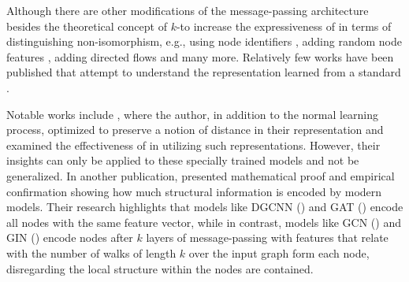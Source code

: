 Although there are other modifications of the message-passing architecture besides the theoretical concept of $k$-\gnn to increase the expressiveness of \gnns in terms of distinguishing non-isomorphism, e.g., using node identifiers \cite{Vignac2020}, adding random node features \cite{Sato2021,Abboud2020}, adding directed flows \cite{Beaini2021} and many more. Relatively few works have been published that attempt to understand the representation learned from a standard \gnn.

Notable works include \cite{Nikolentzos2023weisfeiler}, where the author, in addition to the normal learning process, optimized \gnns to preserve a notion of distance in their representation and examined the effectiveness of \gnns in utilizing such representations. However, their insights can only be applied to these specially trained \gnn models and not be generalized. In another publication, \cite{Nikolentzos2023} presented mathematical proof and empirical confirmation showing how much structural information is encoded by modern \gnn models. Their research highlights that \gnn models like DGCNN (\cite{Zhang2018}) and GAT (\cite{Velivckovic2017}) encode all nodes with the same feature vector, while in contrast, models like GCN (\cite{Kip+2017}) and GIN (\cite{Xu2018}) encode nodes after $k$ layers of message-passing with features that relate with the number of walks of length $k$ over the input graph form each node, disregarding the local structure within the nodes are contained.
